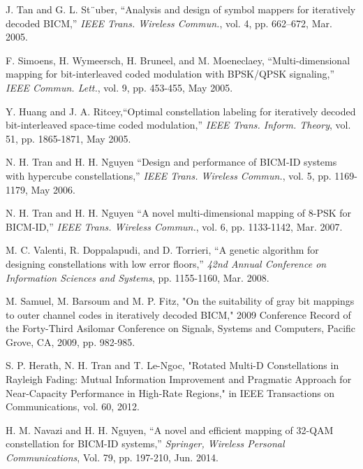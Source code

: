 \documentclass[12pt, draftclsnofoot, onecolumn]{IEEEtran}
\begin{document}
\begin{thebibliography}{bl}
 J. Tan and G. L. St¨uber, ``Analysis and design of symbol mappers for iteratively decoded BICM,” \newblock \emph {IEEE Trans. Wireless Commun.}, vol. 4,
pp. 662–672, Mar. 2005.

 F. Simoens, H. Wymeersch, H. Bruneel, and M. Moeneclaey, ``Multi-dimensional mapping for bit-interleaved coded modulation with BPSK/QPSK signaling,'' \newblock \emph {IEEE Commun. Lett.}, vol. 9, pp. 453-455, May 2005.

 Y. Huang and J. A. Ritcey,\newblock  ``Optimal constellation labeling for iteratively decoded bit-interleaved space-time coded modulation,'' \newblock \emph{IEEE Trans. Inform. Theory}, vol. 51, pp. 1865-1871, May 2005.

 N. H. Tran and H. H. Nguyen \newblock ``Design and performance of BICM-ID systems with hypercube constellations,'' \newblock \emph {IEEE Trans. Wireless Commun.}, vol. 5,  pp. 1169-1179, May 2006.

 N. H. Tran and H. H. Nguyen \newblock ``A novel multi-dimensional mapping of 8-PSK for BICM-ID,'' \newblock \emph {IEEE Trans. Wireless Commun.}, vol. 6,  pp. 1133-1142, Mar. 2007.

 M. C. Valenti, R. Doppalapudi, and D. Torrieri, \newblock ``A genetic algorithm for designing constellations with low error floors,'' \newblock \emph {42nd Annual Conference on Information Sciences and Systems},  pp. 1155-1160, Mar.  2008.

M. Samuel, M. Barsoum and M. P. Fitz, "On the suitability of gray bit mappings to outer channel codes in iteratively decoded BICM," 2009 Conference Record of the Forty-Third Asilomar Conference on Signals, Systems and Computers, Pacific Grove, CA, 2009, pp. 982-985.


 S. P. Herath, N. H. Tran and T. Le-Ngoc, "Rotated Multi-D Constellations in Rayleigh Fading: Mutual Information Improvement and Pragmatic Approach for Near-Capacity Performance in High-Rate Regions," in IEEE Transactions on Communications, vol. 60, 2012.

 H. M. Navazi and H. H. Nguyen, \newblock ``A novel and efficient mapping of 32-QAM constellation for BICM-ID systems,'' \newblock \emph{Springer, Wireless Personal Communications}, Vol. 79, pp. 197-210, Jun. 2014. 


\end{thebibliography}
\end{document}
